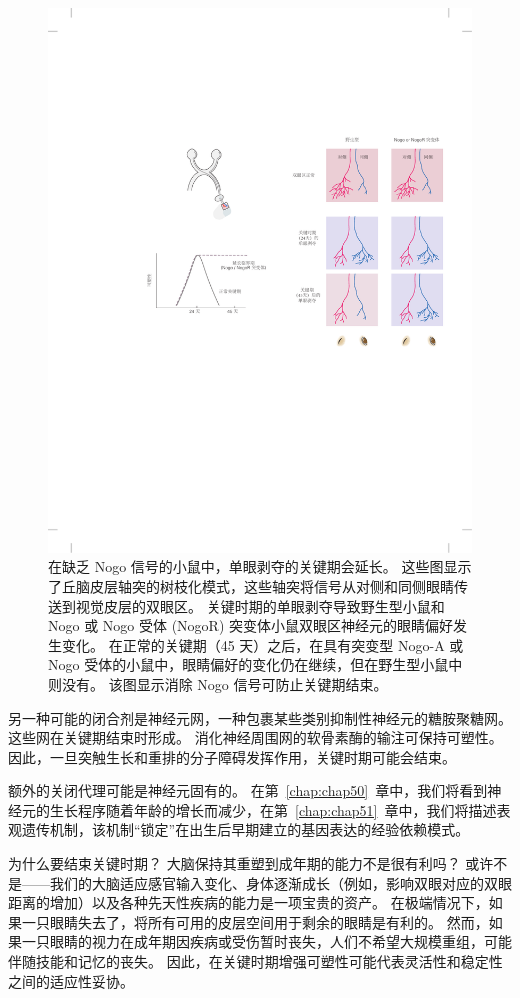 \begin{figure}[htbp]
	\centering
	\includegraphics[width=0.6\linewidth]{chap49/fig_49_12}
	\caption{在缺乏 Nogo 信号的小鼠中，单眼剥夺的关键期会延长。
		这些图显示了丘脑皮层轴突的树枝化模式，这些轴突将信号从对侧和同侧眼睛传送到视觉皮层的双眼区。
		关键时期的单眼剥夺导致野生型小鼠和 Nogo 或 Nogo 受体 (NogoR) 突变体小鼠双眼区神经元的眼睛偏好发生变化。
		在正常的关键期（45 天）之后，在具有突变型 Nogo-A 或 Nogo 受体的小鼠中，眼睛偏好的变化仍在继续，但在野生型小鼠中则没有。
		该图显示消除 Nogo 信号可防止关键期结束\cite{mcgee2005experience}。}
	\label{fig:49_12}
\end{figure}


另一种可能的闭合剂是神经元网，一种包裹某些类别抑制性神经元的糖胺聚糖网。
这些网在关键期结束时形成。
消化神经周围网的软骨素酶的输注可保持可塑性。
因此，一旦突触生长和重排的分子障碍发挥作用，关键时期可能会结束。


额外的关闭代理可能是神经元固有的。
在第~\ref{chap:chap50}~章中，我们将看到神经元的生长程序随着年龄的增长而减少，在第~\ref{chap:chap51}~章中，我们将描述表观遗传机制，该机制“锁定”在出生后早期建立的基因表达的经验依赖模式。


为什么要结束关键时期？
大脑保持其重塑到成年期的能力不是很有利吗？
或许不是——我们的大脑适应感官输入变化、身体逐渐成长（例如，影响双眼对应的双眼距离的增加）以及各种先天性疾病的能力是一项宝贵的资产。
在极端情况下，如果一只眼睛失去了，将所有可用的皮层空间用于剩余的眼睛是有利的。
然而，如果一只眼睛的视力在成年期因疾病或受伤暂时丧失，人们不希望大规模重组，可能伴随技能和记忆的丧失。
因此，在关键时期增强可塑性可能代表灵活性和稳定性之间的适应性妥协。



